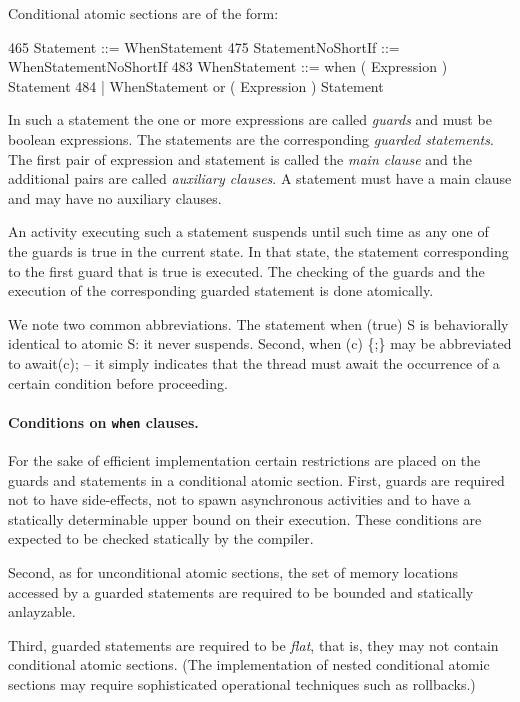 {{Conditional atomic sections are of the form:
\begin{x10}
465 Statement ::= WhenStatement
475 StatementNoShortIf ::= WhenStatementNoShortIf
483 WhenStatement ::= 
          when ( Expression ) Statement
484     | WhenStatement 
          or ( Expression ) Statement
\end{x10}

In such a statement the one or more expressions are called {\em
guards} and must be {\cf boolean} expressions. The statements are the
corresponding {\em guarded statements}. The first pair of expression
and statement is called the {\em main clause} and the additional pairs
are called {\em auxiliary clauses}. A statement must have a main
clause and may have no auxiliary clauses.

An activity executing such a statement suspends until such time as any
one of the guards is true in the current state. In that state, the
statement corresponding to the first guard that is true is executed.
The checking of the guards and the execution of the corresponding
guarded statement is done atomically. 

We note two common abbreviations. The statement {\cf when (true) S} is
behaviorally identical to {\cf atomic S}: it never suspends. Second,
{\cf when (c) \{;\}} may be abbreviated to {\cf await(c);} -- it
simply indicates that the thread must await the occurrence of a
certain condition before proceeding.  

\paragraph{Conditions on {\tt when} clauses.} 

For the sake of efficient implementation certain restrictions are
placed on the guards and statements in a conditional atomic
section. First, guards are required not to have side-effects, not to
spawn asynchronous activities and to have a statically determinable
upper bound on their execution. These conditions are expected to
be checked statically by the compiler.

Second, as for unconditional atomic sections, the set of memory
locations accessed by a guarded statements are required to be bounded
and statically anlayzable.

Third, guarded statements are required to be {\em flat}, that is, they
may not contain conditional atomic sections. (The implementation of
nested conditional atomic sections may require sophisticated
operational techniques such as rollbacks.)

}}
